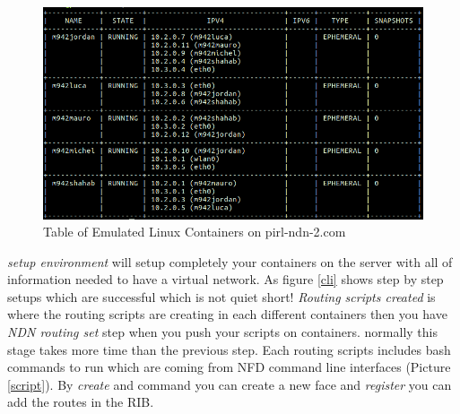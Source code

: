 \begin{figure}[H]

\begin{center}

\includegraphics[scale = 0.3]{Pictures/table.png}

\caption{Table of Emulated Linux Containers on pirl-ndn-2.com} \label{table} 

\end{center}

\end{figure}


 
\textit{setup environment} will setup completely your containers on the server with all of information needed to have a virtual network. As figure \ref{cli} shows step by step setups which are successful which is not quiet short! \textit{Routing scripts created} is where the routing scripts are creating in each different containers then you have \textit{NDN routing set} step when you push your scripts on containers. normally this stage takes more time than the previous step. Each routing scripts includes bash commands to run which are coming from NFD command line interfaces (Picture \ref{script}). By \textit{create} and  command you can create a new face and \textit{register} you can add the routes in the RIB.   
 
